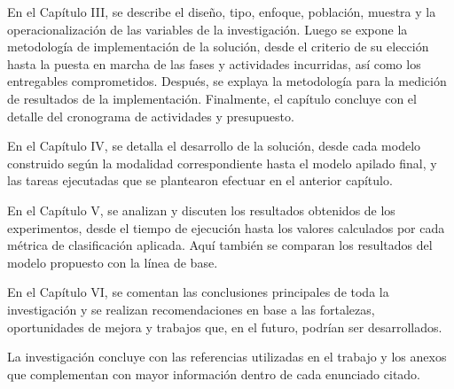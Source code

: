 En el Capítulo III, se describe el diseño, tipo, enfoque, población, muestra y la operacionalización de las variables de la investigación. Luego se expone la metodología de implementación de la solución, desde el criterio de su elección hasta la puesta en marcha de las fases y actividades incurridas, así como los entregables comprometidos. Después, se explaya la metodología para la medición de resultados de la implementación. Finalmente, el capítulo concluye con el detalle del cronograma de actividades y presupuesto.

En el Capítulo IV, se detalla el desarrollo de la solución, desde cada modelo construido según la modalidad correspondiente hasta el modelo apilado final, y las tareas ejecutadas que se plantearon efectuar en el anterior capítulo.

En el Capítulo V, se analizan y discuten los resultados obtenidos de los experimentos, desde el tiempo de ejecución hasta los valores calculados por cada métrica de clasificación aplicada. Aquí también se comparan los resultados del modelo propuesto con la línea de base.

En el Capítulo VI, se comentan las conclusiones principales de toda la investigación y se realizan recomendaciones en base a las fortalezas, oportunidades de mejora y trabajos que, en el futuro, podrían ser desarrollados.

La investigación concluye con las referencias utilizadas en el trabajo y los anexos que complementan con mayor información dentro de cada enunciado citado.

